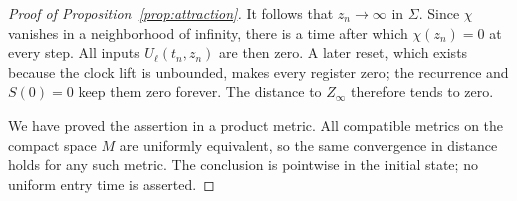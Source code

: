 \begin{proof}[Proof of Proposition~\ref{prop:attraction}]
It follows that $z_n\to\infty$ in $\Sigma$.  Since $\chi$ vanishes in a
neighborhood of infinity, there is a time after which $\chi(z_n)=0$ at
every step.  All inputs $U_\ell(t_n,z_n)$ are then zero.  A later reset, which
exists because the clock lift is unbounded, makes every register zero;
the recurrence and $S(0)=0$ keep them zero forever.  The distance to
$Z_\infty$ therefore tends to zero.

We have proved the assertion in a product metric.  All compatible metrics
on the compact space $M$ are uniformly equivalent, so the same convergence
in distance holds for any such metric.  The conclusion is pointwise in
the initial state; no uniform entry time is asserted.
\end{proof}
